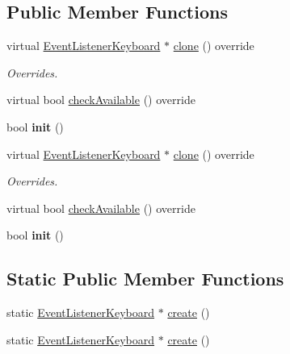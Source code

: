 \subsection*{Public Member Functions}
\begin{DoxyCompactItemize}
\item 
\mbox{\label{classEventListenerKeyboard_afef5b79568f3b28f9f1bacdfe90067f5}} 
virtual \hyperlink{classEventListenerKeyboard}{Event\+Listener\+Keyboard} $\ast$ \hyperlink{classEventListenerKeyboard_afef5b79568f3b28f9f1bacdfe90067f5}{clone} () override
\begin{DoxyCompactList}\small\item\em Overrides. \end{DoxyCompactList}\item 
virtual bool \hyperlink{classEventListenerKeyboard_a7f7d0c2e82388278bfc98ff457dc2da8}{check\+Available} () override
\item 
\mbox{\label{classEventListenerKeyboard_ab69c91b22c4c19ad346f1a42303df153}} 
bool {\bfseries init} ()
\item 
\mbox{\label{classEventListenerKeyboard_a6597435f0ccb2d981201b1c2de867f93}} 
virtual \hyperlink{classEventListenerKeyboard}{Event\+Listener\+Keyboard} $\ast$ \hyperlink{classEventListenerKeyboard_a6597435f0ccb2d981201b1c2de867f93}{clone} () override
\begin{DoxyCompactList}\small\item\em Overrides. \end{DoxyCompactList}\item 
virtual bool \hyperlink{classEventListenerKeyboard_a855c94e047e48d3ab419ae43280231c3}{check\+Available} () override
\item 
\mbox{\label{classEventListenerKeyboard_ab69c91b22c4c19ad346f1a42303df153}} 
bool {\bfseries init} ()
\end{DoxyCompactItemize}
\subsection*{Static Public Member Functions}
\begin{DoxyCompactItemize}
\item 
static \hyperlink{classEventListenerKeyboard}{Event\+Listener\+Keyboard} $\ast$ \hyperlink{classEventListenerKeyboard_a1962de2a4fc33624a151427141cb5d7e}{create} ()
\item 
static \hyperlink{classEventListenerKeyboard}{Event\+Listener\+Keyboard} $\ast$ \hyperlink{classEventListenerKeyboard_a5d5328ee7886dc199940fce87de5488e}{create} ()
\end{DoxyCompactItemize}
